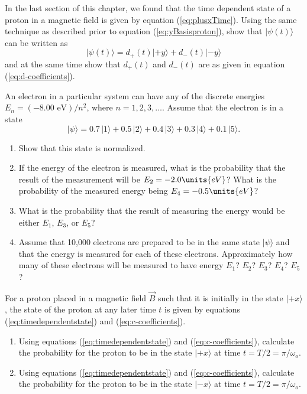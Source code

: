 \begin{problem}
In the last section of this chapter, we found that the time dependent state of a proton in a magnetic field is given by equation (\ref{eq:plusxTime}). Using the same technique as described prior to equation (\ref{eq:yBasisproton}), show that $\vert\mbox{$\psi(t)$}\rangle$ can be written as 
\[ \vert\mbox{$\psi(t)$}\rangle = d_+(t) \vert\mbox{$+y$}\rangle + d_-(t) \vert\mbox{$-y$}\rangle \]
and at the same time show that $d_+(t)$ and $d_-(t)$ are as given in equation (\ref{eq:d-coefficients}).
\end{problem}

\begin{problem}
An electron in a particular system can have any of the discrete
  energies $E_n = (-8.00\mbox{ eV})/n^2$, where $n = 1, 2, 3, \dots$. Assume
  that the electron is in a state 
  \[ |\psi\rangle = 0.7\,|1\rangle + 0.5\,|2\rangle + 0.4\,|3\rangle 
        + 0.3\,|4\rangle + 0.1\,|5\rangle.  \]
  \begin{enumerate}
  \item Show that this state is normalized.
  \item If the energy of the electron is measured, what is the probability that the result of the measurement will be $E_2 = -2.0\units{eV}$? What is the probability of the measured energy being $E_4 = -0.5\units{eV}$?
  \item What is the probability that the result of measuring the energy would be either $E_1$, $E_3$, or $E_5$?
  
  \item Assume that 10,000 electrons are prepared to be in the same
    state $|\psi\rangle$ and that the energy is measured for each of these electrons.  Approximately how many of these electrons will be measured to have energy $E_1$?  $E_2$?  $E_3$?  $E_4$?  $E_5$?
  
  \end{enumerate}
\label{prob:atomic_energies}
\end{problem}

\begin{problem}
For a proton placed in a magnetic field $\vec{B}$ such that it is initially in the state $\vert\mbox{$+x$}\rangle$, the state of the proton at any later time $t$ is given by equations (\ref{eq:timedependentstate}) and (\ref{eq:c-coefficients}).  
\begin{enumerate}
\item Using equations (\ref{eq:timedependentstate}) and (\ref{eq:c-coefficients}), calculate the probability for the proton to be in the state $\vert\mbox{$+x$}\rangle$ at time $t = T/2 = \pi/\omega_o$.
\item Using equations (\ref{eq:timedependentstate}) and (\ref{eq:c-coefficients}), calculate the probability for the proton to be in the state $\vert\mbox{$-x$}\rangle$ at time $t = T/2 = \pi/\omega_o$.
\end{enumerate}
\end{problem}


